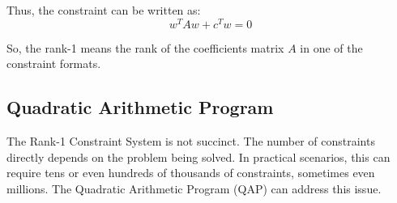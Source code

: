 \documentclass[../lecture-notes.tex]{subfiles}
\begin{document}
Thus, the constraint can be written as:
\[ w^T A w + c^T w = 0 \]

So, the rank-1 means the rank of the coefficients matrix $A$ in one of the constraint formats.

\subsection{Quadratic Arithmetic Program}

The Rank-1 Constraint System is not succinct. The number of constraints directly depends
on the problem being solved. In practical scenarios, this can require tens or even hundreds of
thousands of constraints, sometimes even millions. The Quadratic Arithmetic Program (QAP) can 
address this issue.
\end{document}
